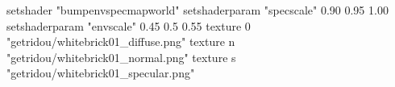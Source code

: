setshader "bumpenvspecmapworld"
setshaderparam "specscale" 0.90 0.95 1.00
setshaderparam "envscale"  0.45 0.5 0.55
   texture 0 "getridou/whitebrick01_diffuse.png"
   texture n "getridou/whitebrick01_normal.png"
   texture s "getridou/whitebrick01_specular.png"
